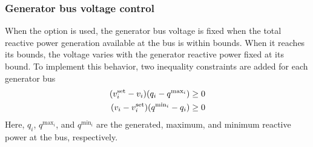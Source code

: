 \subsubsection{Generator bus voltage control}
When the option \opflowoption{\opflowgenbusvoltage~\fixedwithinqbounds} is used, the generator bus voltage is fixed when the total reactive power generation available at the bus is within bounds. When it reaches its bounds, the voltage varies with the generator reactive power fixed at its bound. To implement this behavior, two inequality constraints are added for each generator bus
\begin{equation}
\begin{aligned}
(v^{\text{set}}_i - v_i)(q_i - q^{\text{max}_i}) \ge 0 \\
(v_i - v^{\text{set}}_i)(q^{\text{min}_i} - q_i) \ge 0
\end{aligned}
\label{eq:opflow_genbusvoltage}
\end{equation}
Here, $q_i$, $q^{\text{max}_i}$, and $q^{\text{min}_i}$ are the generated, maximum, and minimum reactive power at the bus, respectively.

\begin{comment}
\subssubection{Voltage magnitude for cartesian coordinates}
When using cartesian coordinates for voltages, inequality constraints (\ref{eq:opflow_ineq_vmag}) need to introduced to constraining the voltage magnitude within its bounds
\begin{equation}
  {\vmini}^2 \le {\vreali}^2 + {\vimagi}^2 \le {\vmaxi}^2,~~\iinJbus
\label{eq:opflow_ineq_vmag}
\end{equation}
\end{comment}

